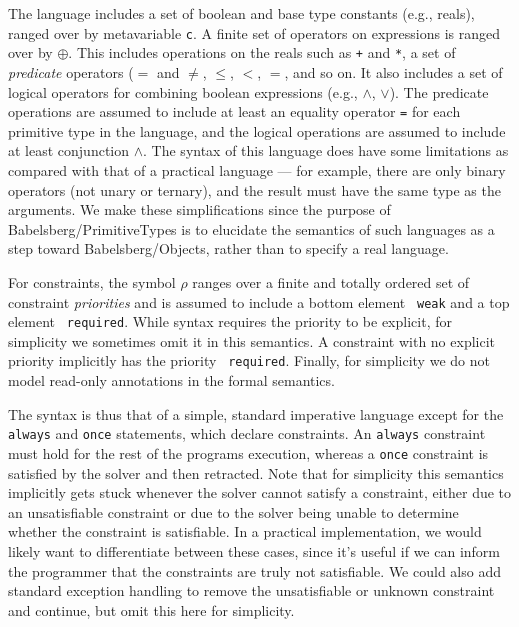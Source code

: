 \documentclass{article}
\begin{document}
The language includes a set of boolean and base type constants (e.g., reals), ranged over by metavariable \texttt{c}. A
finite set of operators on expressions is ranged over by $\oplus$. This includes
operations on the reals such as \texttt{+} and \texttt{*},
a set of {\em predicate} operators (\texttt{$=$} and \texttt{$\neq$},
$\leq$, $<$, $=$, and so on. It also includes a set of logical operators for combining
boolean expressions (e.g., \texttt{$\wedge$}, \texttt{$\vee$}).  The
predicate operations are assumed to include at least an equality
operator \texttt{=} for each primitive type in the language, and the
logical operations are assumed to include at least conjunction \texttt{$\wedge$}.
The syntax of this language does have some limitations as compared
with that of a practical language --- for example, there are only
binary operators (not unary or ternary), and the result must have the
same type as the arguments.  We make these simplifications since the
purpose of Babelsberg/PrimitiveTypes is to elucidate the semantics of
such languages as a step toward Babelsberg/Objects, rather than to
specify a real language.

For constraints, the symbol $\rho$ ranges over a finite and totally
ordered set of constraint {\em priorities} and is assumed to include a
bottom element \texttt{ weak}
and a top element \texttt{ required}. While syntax requires the priority to be
explicit, for simplicity we sometimes omit it in this semantics. A
constraint with no explicit priority implicitly has the priority \texttt{
  required}.  Finally, for simplicity we do not model read-only
annotations in the formal semantics.

The syntax is thus that of a simple, 
standard imperative language except for the
\texttt{always} and \texttt{once} statements, which declare constraints.
An \texttt{always} constraint must
hold for the rest of the programs execution, whereas a \texttt{once}
constraint is satisfied by the solver and then retracted. 
%
Note that for simplicity this semantics implicitly gets stuck whenever
the solver cannot satisfy a constraint, either due to an unsatisfiable
constraint or due to the solver being unable to determine whether the
constraint is satisfiable. In a practical implementation, we would
likely want to differentiate between 
these cases, since it's useful if we can
inform the programmer that the constraints are truly not satisfiable.
We could also add standard exception handling to remove the
unsatisfiable or unknown constraint and continue, but omit this here
for simplicity.
\end{document}
